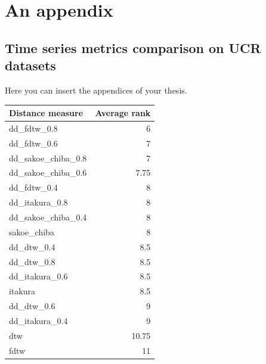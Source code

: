 \appendix %
\chapter{An appendix}

\section{Time series metrics comparison on UCR datasets}
\label{sec:app-ucr}
Here you can insert the appendices of your thesis.


\begin{table}[htp]
\begin{tabular}{l|r}
\textbf{Distance measure} & \multicolumn{1}{l}{\textbf{Average rank}} \\ \hline
dd\_fdtw\_0.8             & 6                                         \\
dd\_fdtw\_0.6             & 7                                         \\
dd\_sakoe\_chiba\_0.8     & 7                                         \\
dd\_sakoe\_chiba\_0.6     & 7.75                                      \\
dd\_fdtw\_0.4             & 8                                         \\
dd\_itakura\_0.8          & 8                                         \\
dd\_sakoe\_chiba\_0.4     & 8                                         \\
sakoe\_chiba              & 8                                         \\
dd\_dtw\_0.4              & 8.5                                       \\
dd\_dtw\_0.8              & 8.5                                       \\
dd\_itakura\_0.6          & 8.5                                       \\
itakura                   & 8.5                                       \\
dd\_dtw\_0.6              & 9                                         \\
dd\_itakura\_0.4          & 9                                         \\
dtw                       & 10.75                                     \\
fdtw                      & 11                                       
\end{tabular}
\end{table}

